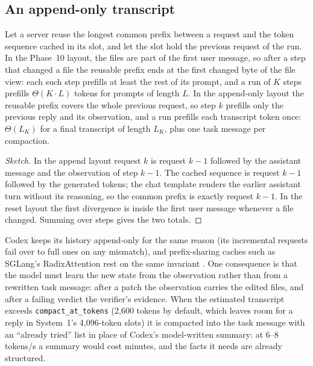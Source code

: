 \subsection{An append-only transcript}

\begin{proposition}\label{prop:prefix}
Let a server reuse the longest common prefix between a request and the token
sequence cached in its slot, and let the slot hold the previous request of the
run. In the Phase~10 layout, the files are part of the first user message, so
after a step that changed a file the reusable prefix ends at the first changed
byte of the file view: each such step prefills at least the rest of its prompt,
and a run of $K$ steps prefills $\Theta(K\cdot L)$ tokens for prompts of length
$L$. In the append-only layout the reusable prefix covers the whole previous
request, so step $k$ prefills only the previous reply and its observation, and a
run prefills each transcript token once: $\Theta(L_K)$ for a final transcript of
length $L_K$, plus one task message per compaction.
\end{proposition}
\begin{proof}[Sketch]
In the append layout request $k$ is request $k-1$ followed by the assistant
message and the observation of step $k-1$. The cached sequence is request $k-1$
followed by the generated tokens; the chat template renders the earlier assistant
turn without its reasoning, so the common prefix is exactly request $k-1$. In the
reset layout the first divergence is inside the first user message whenever a
file changed. Summing over steps gives the two totals.
\end{proof}

Codex keeps its history append-only for the same reason (its incremental requests
fail over to full ones on any mismatch), and prefix-sharing caches such as
SGLang's RadixAttention rest on the same invariant \cite{zheng2024sglang}. One consequence is that the model must
learn the new state from the observation rather than from a rewritten task
message: after a patch the observation carries the edited files, and after a
failing verdict the verifier's evidence. When the estimated transcript exceeds
\texttt{compact\_at\_tokens} (2{,}600 tokens by default, which leaves room for a
reply in System~1's 4{,}096-token slots) it is compacted into the task message
with an ``already tried'' list in place of Codex's model-written summary: at
6--8 tokens/s a summary would cost minutes, and the facts it needs are already
structured.

